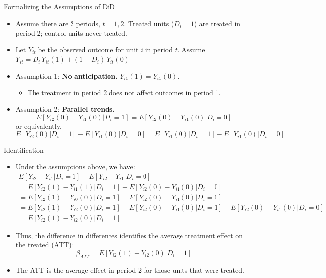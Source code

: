 \documentclass[11pt,notes=hide,aspectratio=169,mathserif]{beamer}
\begin{document}
\begin{frame}{Formalizing the Assumptions of DiD}
\begin{itemize}
  \item Assume there are 2 periods, $t = 1,2$. Treated units ($D_i = 1$) are
  treated in period 2; control units never-treated.
  \item Let $Y_{it}$ be the observed outcome for unit $i$ in period $t$.
  Assume $Y_{it} = D_i\, Y_{it}(1) + (1 - D_i)\, Y_{it}(0)$
  \item Assumption 1: \textbf{No anticipation.} $Y_{i1}(1) = Y_{i1}(0)$.
  \begin{itemize} 
    \item The treatment in period 2 does not affect outcomes in period 1.
  \end{itemize}
  \item Assumption 2: \textbf{Parallel trends.} \\
  \begin{equation*}
    E[Y_{i2}(0) - Y_{i1}(0) | D_i = 1] = E[Y_{i2}(0) - Y_{i1}(0) | D_i = 0]
  \end{equation*}
  or equivalently,
  \begin{equation*}
    E[Y_{i2}(0) | D_i = 1] - E[Y_{i1}(0) | D_i = 0] = E[Y_{i1}(0) | D_i = 1] - E[Y_{i1}(0) | D_i = 0]
  \end{equation*}
\end{itemize}
\end{frame}

\begin{frame}{Identification}
\begin{itemize}
  \item Under the assumptions above, we have:
  \begin{align*}
    E[Y_{i2} - Y_{i1} | D_i = 1] - E[Y_{i2} - Y_{i1} | D_i = 0] 
    \\ = E[Y_{i2}(1) - Y_{i1}(1) | D_i = 1] - E[Y_{i2}(0) - Y_{i1}(0) | D_i = 0] \\
    = E[Y_{i2}(1) - Y_{i0}(0) | D_i = 1] - E[Y_{i2}(0) - Y_{i1}(0) | D_i = 0] \\
    = E[Y_{i2}(1) - Y_{i2}(0) | D_i = 1]  + E[Y_{i2}(0) - Y_{i1}(0) | D_i = 1] - E[Y_{i2}(0) - Y_{i1}(0) | D_i = 0] \\
    = E[Y_{i2}(1) - Y_{i2}(0) | D_i = 1]
  \end{align*}
\item Thus, the difference in differences identifies the average treatment effect on the treated (ATT):
  \begin{equation*}
    \beta_{ATT} = E[Y_{i2}(1) - Y_{i2}(0) | D_i = 1]
  \end{equation*}
\item The ATT is the average effect in period 2 for those units that were treated.
\end{itemize}
\end{frame}
\end{document}
